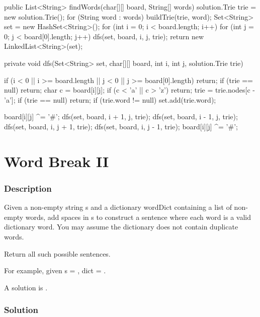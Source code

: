 \newpage

\begin{Code}
public List<String> findWords(char[][] board, String[] words) {
    solution.Trie trie = new solution.Trie();
    for (String word : words) {
        buildTrie(trie, word);
    }
    Set<String> set = new HashSet<String>();
    for (int i = 0; i < board.length; i++) {
        for (int j = 0; j < board[0].length; j++) {
            dfs(set, board, i, j, trie);
        }
    }
    return new LinkedList<String>(set);
}

private void dfs(Set<String> set, char[][] board, int i, int j, solution.Trie trie) {
    if (i < 0 || i >= board.length || j < 0 || j >= board[0].length) {
        return;
    }
    if (trie == null) {
        return;
    }
    char c = board[i][j];
    if (c < 'a' || c > 'z') {
        return;
    }
    trie = trie.nodes[c - 'a'];
    if (trie == null) {
        return;
    }
    if (trie.word != null) {
        set.add(trie.word);
    }

    board[i][j] ^= '#';
    dfs(set, board, i + 1, j, trie);
    dfs(set, board, i - 1, j, trie);
    dfs(set, board, i, j + 1, trie);
    dfs(set, board, i, j - 1, trie);
    board[i][j] ^= '#';
}
\end{Code}

\newpage

\section{Word Break II} %

\subsubsection{Description}
Given a non-empty string s and a dictionary wordDict containing a list of non-empty words, add spaces in s to construct a sentence where each word is a valid dictionary word. You may assume the dictionary does not contain duplicate words.

Return all such possible sentences.

For example, given
s = ,
dict = .

A solution is .

\subsubsection{Solution}

